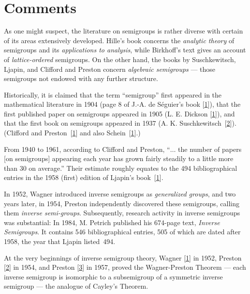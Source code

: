 \documentclass{surv-l}
\numberwithin{equation}{section}
\numberwithin{table}{section}
\numberwithin{figure}{section}
\theoremstyle{definition}
\begin{document}
\section{Comments}\label{sec1.4}

As one might suspect, the literature on semigroups is rather
diverse with certain of its areas extensively developed.
Hille's book concerns the \emph{analytic
theory} of semigroups and its
\emph{applications to analysis}, while Birkhoff's
text gives an account of
\emph{lattice-ordered} semigroups. On the
other hand, the books by Suschkewitsch,
Ljapin, and Clifford and
Preston concern \emph{algebraic semigroups} --- those semigroups not endowed with any further
structure.

Historically, it is claimed that the term ``semigroup'' first
appeared in the mathematical literature in 1904 (page 8 of J.-A.
de S\'{e}guier's book
[\hyperlink{bib70}{1}]), that the first published paper
on semigroups appeared in 1905 (L. E. Dickson
[\hyperlink{bib12}{1}]), and that the first book on
semigroups appeared in 1937 (A. K.
Suschkewitsch~[\hyperlink{bib73a}{2}]). (Clifford and
Preston~[\hyperlink{bib8}{1}] and
also Schein~[\hyperlink{bib69}{1}].)

From 1940 to 1961, according to Clifford and Preston, ``$\ldots$
the number of papers [on semigroups] appearing each year has grown
fairly steadily to a little more than 30 on average.'' Their
estimate roughly equates to the 494 bibliographical entries in the
1958 (first) edition of Ljapin's
book~[\hyperlink{bib46}{1}].

In 1952, Wagner introduced inverse semigroups as \emph{generalized
groups}, and two years later, in 1954, Preston independently
discovered these semigroups, calling them
\emph{inverse semi-groups}.
Subsequently, research activity in inverse semigroups was
substantial: In 1984, M. Petrich published his 674-page text,
\emph{Inverse Semigroups}. It contains
546 bibliographical entries, 505 of which are dated after 1958,
the year that Ljapin listed~494.

At the very beginnings of inverse semigroup theory,
Wagner [\hyperlink{bib78}{1}] in
1952, Preston
[\hyperlink{bib63a}{2}] in 1954, and
Preston [\hyperlink{bib63b}{3}] in
1957, proved the Wagner-Preston Theorem --- each inverse semigroup
is isomorphic to a subsemigroup of a symmetric
inverse semigroup
--- the analogue of Cayley's Theorem.
\end{document}
